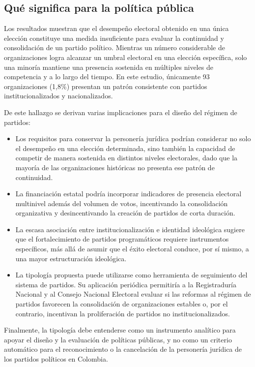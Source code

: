 \documentclass[11pt,letterpaper]{article}
\begin{document}
\subsection{Qué significa para la política pública}

Los resultados muestran que el desempeño electoral obtenido en una única elección constituye una medida insuficiente para evaluar la continuidad y consolidación de un partido político. Mientras un número considerable de organizaciones logra alcanzar un umbral electoral en una elección específica, solo una minoría mantiene una presencia sostenida en múltiples niveles de competencia y a lo largo del tiempo. En este estudio, únicamente 93 organizaciones (1,8\%) presentan un patrón consistente con partidos institucionalizados y nacionalizados.

De este hallazgo se derivan varias implicaciones para el diseño del régimen de partidos:

\begin{itemize}[topsep=0.3em,itemsep=0.35em]
  \item Los requisitos para conservar la personería jurídica podrían considerar no solo el desempeño en una elección determinada, sino también la capacidad de competir de manera sostenida en distintos niveles electorales, dado que la mayoría de las organizaciones históricas no presenta ese patrón de continuidad.
  \item La financiación estatal podría incorporar indicadores de presencia electoral multinivel además del volumen de votos, incentivando la consolidación organizativa y desincentivando la creación de partidos de corta duración.
  \item La escasa asociación entre institucionalización e identidad ideológica sugiere que el fortalecimiento de partidos programáticos requiere instrumentos específicos, más allá de asumir que el éxito electoral conduce, por sí mismo, a una mayor estructuración ideológica.
  \item La tipología propuesta puede utilizarse como herramienta de seguimiento del sistema de partidos. Su aplicación periódica permitiría a la Registraduría Nacional y al Consejo Nacional Electoral evaluar si las reformas al régimen de partidos favorecen la consolidación de organizaciones estables o, por el contrario, incentivan la proliferación de partidos no institucionalizados.
\end{itemize}

Finalmente, la tipología debe entenderse como un instrumento analítico para apoyar el diseño y la evaluación de políticas públicas, y no como un criterio automático para el reconocimiento o la cancelación de la personería jurídica de los partidos políticos en Colombia.
\end{document}
